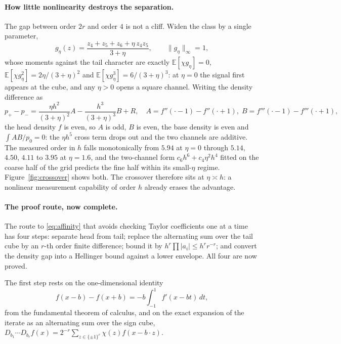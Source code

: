 \paragraph{How little nonlinearity destroys the separation.}
The gap between order $2r$ and order $4$ is not a cliff. Widen the class by a single
parameter,
\[
g_{\eta}(z)=\frac{z_{4}+z_{5}+z_{6}+\eta\,z_{4}z_{5}}{3+\eta},
\qquad\|g_{\eta}\|_{\infty}=1,
\]
whose moments against the tail character are exactly
$\mathbb{E}[\chi g_{\eta}]=0$, $\mathbb{E}[\chi g_{\eta}^{2}]=2\eta/(3+\eta)^{2}$ and
$\mathbb{E}[\chi g_{\eta}^{3}]=6/(3+\eta)^{3}$: at $\eta=0$ the signal first appears at the
cube, and any $\eta>0$ opens a square channel. Writing the density difference as
\[
p_{+}-p_{-}=\frac{\eta h^{2}}{(3+\eta)^{2}}A-\frac{h^{3}}{(3+\eta)^{3}}B+R,
\quad
A=f''(\cdot-1)-f''(\cdot+1),\;
B=f'''(\cdot-1)-f'''(\cdot+1),
\]
the head density $f$ is even, so $A$ is odd, $B$ is even, the base density is even and
$\int AB/p_{0}=0$: the $\eta h^{5}$ cross term drops out and the two channels are
additive. The measured order in $h$ falls monotonically from $5.94$ at $\eta=0$ through
$5.14$, $4.50$, $4.11$ to $3.95$ at $\eta=1.6$, and the two-channel form
$c_{6}h^{6}+c_{4}\eta^{2}h^{4}$ fitted on the coarse half of the grid predicts the fine
half within its small-$\eta$ regime. Figure~\ref{fig:crossover} shows both. The crossover therefore sits at
$\eta\asymp h$: a nonlinear measurement capability of order $h$ already erases
the advantage. \NUM{}


\paragraph{The proof route, now complete.}
The route to \eqref{eq:affinity} that avoids checking Taylor coefficients one at a time has
four steps: separate head from tail; replace the alternating sum over the tail cube by an
$r$-th order finite difference; bound it by $h^{r}\prod|a_{i}|\le h^{r}r^{-r}$; and convert
the density gap into a Hellinger bound against a lower envelope. All four are now proved.

The first step rests on the one-dimensional identity
\[
f(x-b)-f(x+b)=-b\int_{-1}^{1}f'(x-bt)\,dt,
\]
from the fundamental theorem of calculus, and on the exact expansion of the iterate as an
alternating sum over the sign cube,
$D_{b_{1}}\cdots D_{b_{r}}f(x)=2^{-r}\sum_{z\in\{\pm1\}^{r}}\chi(z)f(x-b\cdot z)$.

